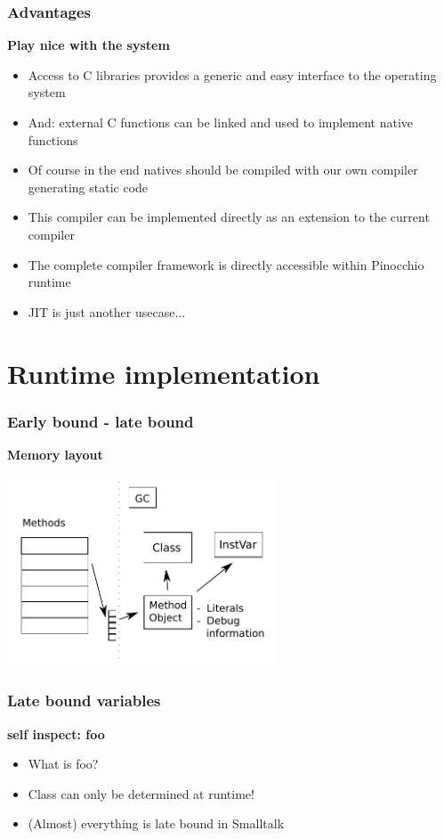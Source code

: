 \documentclass{beamer}
\begin{document}
\begin{frame}[fragile]
    \frametitle{Advantages}
    {\bf Play nice with the system}
    \begin{itemize}
        \item Access to C libraries provides a generic and easy interface to the operating system
        \item And: external C functions can be linked and used to implement native functions
        \item Of course in the end natives should be compiled with our own 
                compiler generating static code
        \item This compiler can be implemented directly as an extension to the current compiler
        \item The complete compiler framework is directly accessible within Pinocchio runtime
        \item JIT is just another usecase...
    \end{itemize}
\end{frame}

\section{Runtime implementation}

\begin{frame}[fragile]
    \frametitle{Early bound - late bound}
    {\bf Memory layout }
    \begin{center}\includegraphics[width=0.6\textwidth]{memory.pdf}\end{center}
\end{frame}

\begin{frame}[fragile]
    \frametitle{Late bound variables}
    {\bf self inspect: foo }
    \begin{itemize}
        \item What is foo?
        \item Class can only be determined at runtime! 
        \item (Almost) everything is late bound in Smalltalk
    \end{itemize}
\end{frame}
\end{document}
